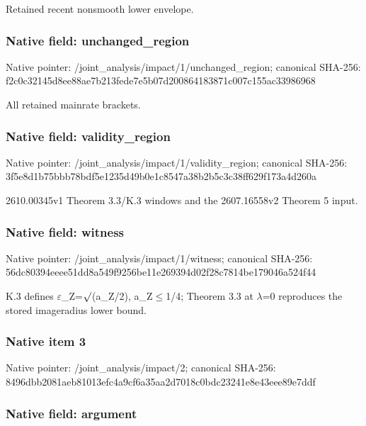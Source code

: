 \documentclass[10pt,a4paper]{article}
\begin{document}
Retained recent nonsmooth lower envelope.


\subsubsection{Native field: unchanged\_region}


Native pointer: /joint\_analysis/impact/1\allowbreak{}/unchanged\_region; canonical SHA-256: f2c0c32145d8ee88ae7b213f\allowbreak{}ede7e5b07d200864183871c0\allowbreak{}07c155ac33986968


All retained mainrate brackets.


\subsubsection{Native field: validity\_region}


Native pointer: /joint\_analysis/impact/1\allowbreak{}/validity\_region; canonical SHA-256: 3f5e8d1b75bbb78bdf5e1235\allowbreak{}d49b0e1c8547a38b2b5c3c38\allowbreak{}ff629f173a4d260a


2610.00345v1 Theorem 3.3/K.3 windows and the 2607.16558v2 Theorem 5 input.


\subsubsection{Native field: witness}


Native pointer: /joint\_analysis/impact/1/witness; canonical SHA-256: 56dc80394eeee51dd8a549f9\allowbreak{}256be11e269394d02f28c781\allowbreak{}4be179046a524f44


K.3 defines \ensuremath{\varepsilon}\_Z=\ensuremath{\sqrt{\vphantom{x}}}(a\_Z/2), a\_Z\ensuremath{\le}1/4; Theorem 3.3 at \ensuremath{\lambda}=0 reproduces the stored imageradius lower bound.


\subsubsection{Native item 3}


Native pointer: /joint\_analysis/impact/2; canonical SHA-256: 8496dbb2081aeb81013efc4a\allowbreak{}9cf6a35aa2d7018c0bdc2324\allowbreak{}1e8e43eee89e7ddf



\subsubsection{Native field: argument}
\end{document}
